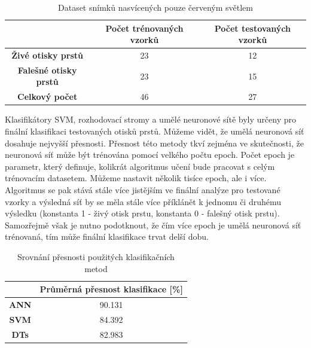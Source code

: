 \capstartfalse
\begin{table}[!htbp]
\centering
\begin{tabular}{|c|c|c|}
\hline
\textbf{}                     & \textbf{Počet trénovaných vzorků} & \textbf{Počet testovaných vzorků} \\ \hline
\textbf{Živé otisky prstů}    & 23                                & 12                                \\ \hline
\textbf{Falešné otisky prstů} & 23                                & 15                                \\ \hline
\textbf{Celkový počet}               & 46                                & 27                                \\ \hline
\end{tabular}
\caption{Dataset snímků nasvícených pouze červeným světlem}
\end{table}
\capstarttrue

Klasifikátory SVM, rozhodovací stromy a umělé neuronové sítě byly určeny pro finální klasifikaci testovaných otisků prstů. Můžeme vidět, že umělá neuronová síť dosahuje nejvyšší přesnosti. Přesnost této metody tkví zejména ve skutečnosti, že neuronová síť může být trénována pomocí velkého počtu epoch. Počet epoch je parametr, který definuje, kolikrát algoritmus učení bude pracovat s celým trénovacím datasetem. \cite{BatchEpochANN} Můžeme nastavit několik tisíce epoch, ale i více. Algoritmus se pak stává stále více jistějším ve finální analýze pro testované vzorky a výsledná síť by se měla stále více příklánět k jednomu či druhému výsledku (konstanta 1 - živý otisk prstu, konstanta 0 - falešný otisk prstu). Samozřejmě však je nutno podotknout, že čím více epoch je umělá neuronová síť trénovaná, tím může finální klasifikace trvat delší dobu. 

\capstartfalse
\begin{table}[!htbp]
\centering
\begin{tabular}{|c|c|}
\hline
                             & \textbf{Průměrná přesnost klasifikace {[}\%{]}} \\ \hline
\textbf{ANN} & 90.131                                         \\ \hline
\textbf{SVM}                 & 84.392                                         \\ \hline
\textbf{DTs}   & 82.983                                         \\ \hline
\end{tabular}
\caption{Srovnání přesnosti použitých klasifikačních metod}
\end{table}
\capstarttrue

